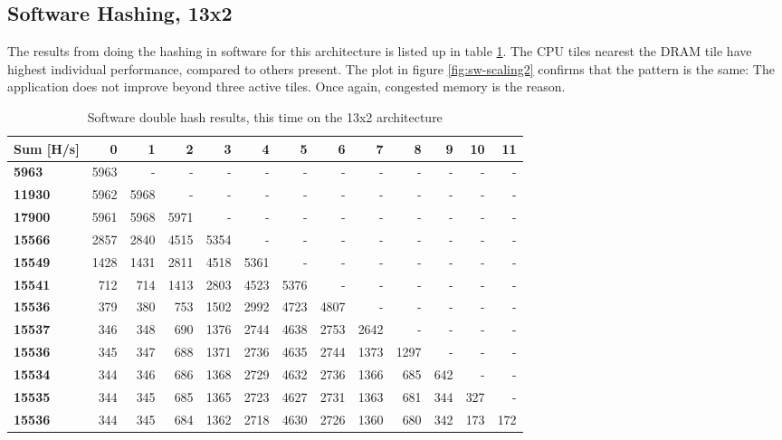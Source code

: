 \begin{appendix}
\subsection{Software Hashing, 13x2}

The results from doing the hashing in software for this architecture is listed up in table \ref{tab:Full-Perf-SW2}. 
The CPU tiles nearest the DRAM tile have highest individual performance, compared to others present.
The plot in figure \ref{fig:sw-scaling2} confirms that the pattern is the same: The application does not improve beyond three active tiles.
Once again, congested memory is the reason.




\begin{table}
\begin{tabular}{| l || r r r r r r r r r r r r |}
  \hline 
  \textbf{Sum} [H/s] & \textbf{0} & \textbf{1} & \textbf{2} & \textbf{3} & \textbf{4} & \textbf{5} & \textbf{6} & \textbf{7} & \textbf{8} & \textbf{9} & \textbf{10} & \textbf{11}\\
  \hline                       
  \textbf{5963} & 5963 & - & - & - & - & - & - & - & - & - & - & - \\
  \textbf{11930} & 5962 & 5968 & - & - & - & - & - & - & - & - & - & - \\
  \textbf{17900} & 5961 & 5968 & 5971 & - & - & - & - & - & - & - & - & - \\
  \textbf{15566} & 2857 & 2840 & 4515 & 5354 & - & - & - & - & - & - & - & - \\
  \textbf{15549} & 1428 & 1431 & 2811 & 4518 & 5361 & - & - & - & - & - & - & - \\
  \textbf{15541} & 712 & 714 & 1413 & 2803 & 4523 & 5376 & - & - & - & - & - & - \\
  \textbf{15536} & 379 & 380 & 753 & 1502 & 2992 & 4723 & 4807 & - & - & - & - & - \\
  \textbf{15537} & 346 & 348 & 690 & 1376 & 2744 & 4638 & 2753 & 2642 & - & - & - & -\\
  \textbf{15536} & 345 & 347 & 688 & 1371 & 2736 & 4635 & 2744 & 1373 & 1297 & - & - & -\\
  \textbf{15534} & 344 & 346 & 686 & 1368 & 2729 & 4632 & 2736 & 1366 & 685 & 642 & - & -\\
  \textbf{15535} & 344 & 345 & 685 & 1365 & 2723 & 4627 & 2731 & 1363 & 681 & 344 & 327 & -\\
  \textbf{15536} & 344 & 345 & 684 & 1362 & 2718 & 4630 & 2726 & 1360 & 680 & 342 & 173 & 172\\
  \hline  
\end{tabular}
\caption{Software double hash results, this time on the 13x2 architecture}
\label{tab:Full-Perf-SW2}
\end{table}




\end{appendix}

